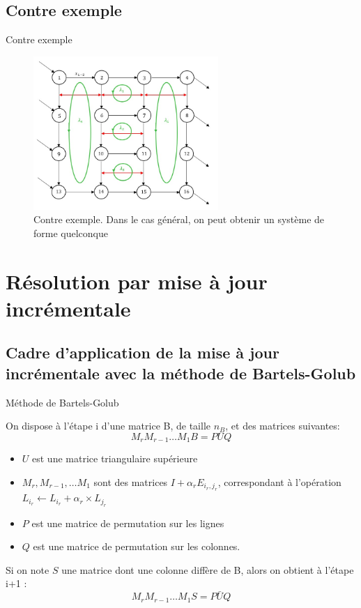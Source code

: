 \documentclass{beamer}
\begin{document}
\subsection{Contre exemple}

\begin{frame}{Contre exemple}
    

\begin{figure}[H]
    \centering
    \includegraphics[width = 7cm]{contre_exemple.jpg}
    \caption{Contre exemple. Dans le cas général, on peut obtenir un système de forme quelconque}
    \label{fig:Contreexemple}
\end{figure}

\insertframenumber\end{frame}

\section{Résolution par mise à jour incrémentale}
\subsection{Cadre d'application de la mise à jour incrémentale avec la méthode de Bartels-Golub}
\begin{frame}{Méthode de Bartels-Golub}

On dispose à l'étape i d'une matrice B, de taille $n_B$, et des matrices suivantes:
$$M_{r}M_{r-1}\dots M_1 B = PUQ$$

\begin{itemize}
    \item $U$ est une matrice triangulaire supérieure
    \item $M_{r},M_{r-1},\dots M_1$ sont des matrices $I + \alpha_r E_{i_r,j_r}$, correspondant à l'opération $L_{i_r} \leftarrow L_{i_r} + \alpha_r \times L_{j_r}$
    \item $P$ est une matrice de permutation sur les lignes
    \item $Q$ est une matrice de permutation sur les colonnes.
\end{itemize}

Si on note $S$ une matrice dont une colonne diffère de B, alors on obtient à l'étape i+1 :
$$M_{r}M_{r-1}\dots M_1 S = P\bar{U}Q$$
\insertframenumber\end{frame}
\end{document}
